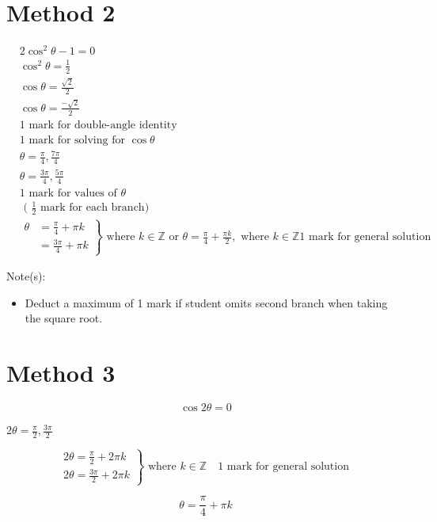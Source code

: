 \documentclass[10pt]{article}
\begin{document}
\section*{Method 2}
$$
\begin{aligned}
& 2 \cos ^{2} \theta-1=0 \\
& \cos ^{2} \theta=\frac{1}{2} \\
& \cos \theta=\frac{\sqrt{2}}{2} \\
& \cos \theta=\frac{-\sqrt{2}}{2} \\
& 1 \text { mark for double-angle identity } \\
& 1 \text { mark for solving for } \cos \theta \\
& \theta=\frac{\pi}{4}, \frac{7 \pi}{4} \\
& \theta=\frac{3 \pi}{4}, \frac{5 \pi}{4} \\
& 1 \text { mark for values of } \theta \\
& \text { ( } \frac{1}{2} \text { mark for each branch) } \\
& \left.\begin{array}{rl}
\theta & =\frac{\pi}{4}+\pi k \\
& =\frac{3 \pi}{4}+\pi k
\end{array}\right\} \text { where } k \in \mathbb{Z} \text { or } \theta=\frac{\pi}{4}+\frac{\pi k}{2}, \text { where } k \in \mathbb{Z} 1 \text { mark for general solution }
\end{aligned}
$$

Note(s):

\begin{itemize}
  \item Deduct a maximum of 1 mark if student omits second branch when taking the square root.
\end{itemize}

\section*{Method 3}
$$
\cos 2 \theta=0
$$

$2 \theta=\frac{\pi}{2}, \frac{3 \pi}{2}$

$$
\left.\begin{array}{l}
2 \theta=\frac{\pi}{2}+2 \pi k \\
2 \theta=\frac{3 \pi}{2}+2 \pi k
\end{array}\right\} \text { where } k \in \mathbb{Z} \quad 1 \text { mark for general solution }
$$

$$
\theta=\frac{\pi}{4}+\pi k
$$
\end{document}
